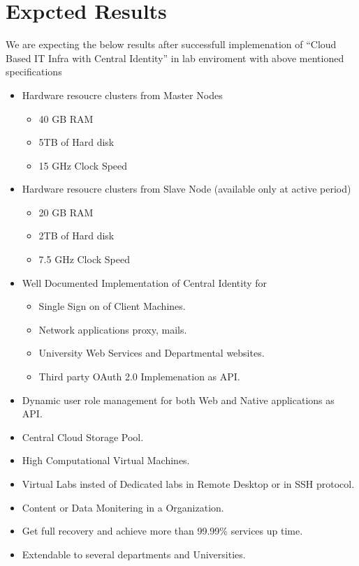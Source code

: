 \documentclass[12pt]{report}
\begin{document}
\section{Expcted Results}

	We are expecting the below results after successfull implemenation of ``Cloud Based IT Infra with Central Identity'' in lab enviroment with above mentioned specifications

	\begin{itemize}	
	\item Hardware resoucre clusters from Master Nodes
	 \begin{itemize}
	 	\item 40 GB RAM
		\item 5TB of Hard disk
		\item 15 GHz Clock Speed	
	 \end{itemize}
		
	\item Hardware resoucre clusters from Slave Node (available only at active period)
	 \begin{itemize}
	 	\item 20 GB RAM
		\item 2TB of Hard disk
		\item 7.5 GHz Clock Speed	
	 \end{itemize}
	 
	\item Well Documented Implementation of Central Identity for 
	 \begin{itemize}
	 	\item Single Sign on of Client Machines.
	 	\item Network applications proxy, mails.
	 	\item University Web Services and Departmental websites.
	 	\item Third party OAuth 2.0 Implemenation as API. 
	 \end{itemize}
	\item Dynamic user role management for both Web and Native applications as API.
	\item Central Cloud Storage Pool.
	\item High Computational Virtual Machines.
	\item Virtual Labs insted of Dedicated labs in Remote Desktop or in SSH protocol.
	\item Content or Data Monitering in a Organization.
	\item Get full recovery and achieve more than 99.99\% services up time.
	\item Extendable to several departments and Universities.
	
	\end{itemize}
\end{document}
